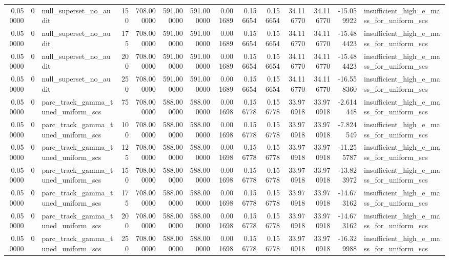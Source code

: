 \begin{tabular}{rrlrrrrrrrrrrl}
0.050000 & 0 & null_superset_no_audit & 150 & 708.000000 & 591.000000 & 591.000000 & 0.001689 & 0.156654 & 0.156654 & 34.116770 & 34.116770 & -15.059922 & insufficient_high_e_mass_for_uniform_scs \\
0.050000 & 0 & null_superset_no_audit & 175 & 708.000000 & 591.000000 & 591.000000 & 0.001689 & 0.156654 & 0.156654 & 34.116770 & 34.116770 & -15.484423 & insufficient_high_e_mass_for_uniform_scs \\
0.050000 & 0 & null_superset_no_audit & 200 & 708.000000 & 591.000000 & 591.000000 & 0.001689 & 0.156654 & 0.156654 & 34.116770 & 34.116770 & -15.484423 & insufficient_high_e_mass_for_uniform_scs \\
0.050000 & 0 & null_superset_no_audit & 250 & 708.000000 & 591.000000 & 591.000000 & 0.001689 & 0.156654 & 0.156654 & 34.116770 & 34.116770 & -16.558360 & insufficient_high_e_mass_for_uniform_scs \\
0.050000 & 0 & parc_track_gamma_tuned_uniform_scs & 75 & 708.000000 & 588.000000 & 588.000000 & 0.001698 & 0.156778 & 0.156778 & 33.970918 & 33.970918 & -2.614448 & insufficient_high_e_mass_for_uniform_scs \\
0.050000 & 0 & parc_track_gamma_tuned_uniform_scs & 100 & 708.000000 & 588.000000 & 588.000000 & 0.001698 & 0.156778 & 0.156778 & 33.970918 & 33.970918 & -7.824549 & insufficient_high_e_mass_for_uniform_scs \\
0.050000 & 0 & parc_track_gamma_tuned_uniform_scs & 125 & 708.000000 & 588.000000 & 588.000000 & 0.001698 & 0.156778 & 0.156778 & 33.970918 & 33.970918 & -11.255787 & insufficient_high_e_mass_for_uniform_scs \\
0.050000 & 0 & parc_track_gamma_tuned_uniform_scs & 150 & 708.000000 & 588.000000 & 588.000000 & 0.001698 & 0.156778 & 0.156778 & 33.970918 & 33.970918 & -13.823972 & insufficient_high_e_mass_for_uniform_scs \\
0.050000 & 0 & parc_track_gamma_tuned_uniform_scs & 175 & 708.000000 & 588.000000 & 588.000000 & 0.001698 & 0.156778 & 0.156778 & 33.970918 & 33.970918 & -14.673162 & insufficient_high_e_mass_for_uniform_scs \\
0.050000 & 0 & parc_track_gamma_tuned_uniform_scs & 200 & 708.000000 & 588.000000 & 588.000000 & 0.001698 & 0.156778 & 0.156778 & 33.970918 & 33.970918 & -14.673162 & insufficient_high_e_mass_for_uniform_scs \\
0.050000 & 0 & parc_track_gamma_tuned_uniform_scs & 250 & 708.000000 & 588.000000 & 588.000000 & 0.001698 & 0.156778 & 0.156778 & 33.970918 & 33.970918 & -16.329988 & insufficient_high_e_mass_for_uniform_scs \\

\end{tabular}
